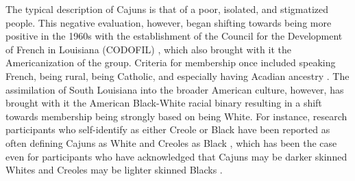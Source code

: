 \documentclass{article}\usepackage[]{graphicx}\usepackage[]{xcolor}
\begin{document}
      The typical description of Cajuns is that of a poor, isolated, and stigmatized people.
      This negative evaluation, however, began shifting towards being more positive in the 1960s with the establishment of the Council for the Development of French in Louisiana (CODOFIL) \parencite[pp.~31-33]{brown_pronominal_1988}, which also brought with it the Americanization of the group.
      Criteria for membership once included speaking French, being rural, being Catholic, and especially having Acadian ancestry \parencite{johnson_louisiana_1976, neumann_creole_1985, smith_influence_1939}.
      The assimilation of South Louisiana into the broader American culture, however, has brought with it the American Black-White racial binary resulting in a shift towards membership being strongly based on being White.
      For instance, research participants who self-identify as either Creole or Black have been reported as often defining Cajuns as White and Creoles as Black \parencite[p.~34]{giancarlo_dont_2019}, which has been the case even for participants who have acknowledged that Cajuns may be darker skinned Whites and Creoles may be lighter skinned Blacks \parencite[Stanford, 2016, as cited in][p.~32]{giancarlo_dont_2019}.

\end{document}
